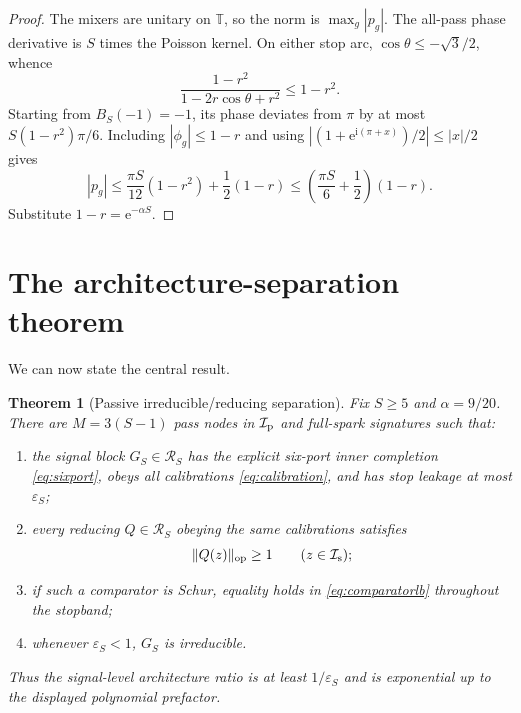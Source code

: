 \documentclass[11pt]{article}
\newtheorem{theorem}{Theorem}[section]
\theoremstyle{definition}
\theoremstyle{remark}
\newcommand{\T}{\mathbb{T}}
\newcommand{\cR}{\mathcal{R}}
\newcommand{\cI}{\mathcal{I}}
\newcommand{\op}{\mathrm{op}}
\newcommand{\e}{\mathrm{e}}
\begin{document}
\begin{proof}
The mixers are unitary on $\T$, so the norm is $\max_g|p_g|$.  The all-pass
phase derivative is $S$ times the Poisson kernel.  On either stop arc,
$\cos\theta\leq-\sqrt3/2$, whence
\[
 \frac{1-r^2}{1-2r\cos\theta+r^2}\leq1-r^2.
\]
Starting from $B_S(-1)=-1$, its phase deviates from $\pi$ by at most
$S(1-r^2)\pi/6$.  Including $|\phi_g|\leq1-r$ and using
$|(1+\e^{\mathrm{i}(\pi+x)})/2|\leq|x|/2$ gives
\[
 |p_g|\leq\frac{\pi S}{12}(1-r^2)+\frac12(1-r)
 \leq\left(\frac{\pi S}{6}+\frac12\right)(1-r).
\]
Substitute $1-r=\e^{-\alpha S}$.
\end{proof}

\section{The architecture-separation theorem}

We can now state the central result.

\begin{theorem}[Passive irreducible/reducing separation]\label{thm:separation}
Fix $S\geq5$ and $\alpha=9/20$.  There are $M=3(S-1)$ pass nodes in
$\cI_{\rm p}$ and full-spark signatures such that:
\begin{enumerate}
 \item the signal block $G_S\in\cR_S$ has the explicit six-port inner
 completion \eqref{eq:sixport}, obeys all calibrations
 \eqref{eq:calibration}, and has stop leakage at most $\varepsilon_S$;
 \item every reducing $Q\in\cR_S$ obeying the same calibrations satisfies
 \begin{equation}\label{eq:comparatorlb}
   \|Q(z)\|_{\op}\geq1\qquad(z\in\cI_{\rm s});
 \end{equation}
 \item if such a comparator is Schur, equality holds in
 \eqref{eq:comparatorlb} throughout the stopband;
 \item whenever $\varepsilon_S<1$, $G_S$ is irreducible.
\end{enumerate}
Thus the signal-level architecture ratio is at least $1/\varepsilon_S$ and is
exponential up to the displayed polynomial prefactor.
\end{theorem}
\end{document}
